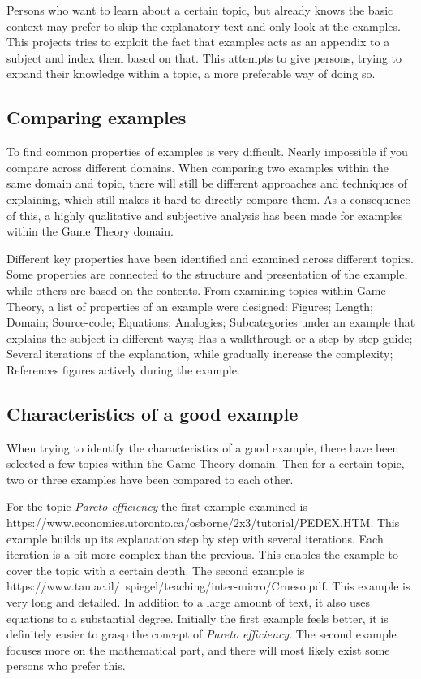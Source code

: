 Persons who want to learn about a certain topic, but already knows the basic context may prefer to skip the explanatory text and only look at the examples. This projects tries to exploit the fact that examples acts as an appendix to a subject and index them based on that. This attempts to give persons, trying to expand their knowledge within a topic, a more preferable way of doing so.

\subsection{Comparing examples} \label{comparing_examples}

To find common properties of examples is very difficult. Nearly impossible if you compare across different domains. When comparing two examples within the same domain and topic, there will still be different approaches and techniques of explaining, which still makes it hard to directly compare them. As a consequence of this, a highly qualitative and subjective analysis has been made for examples within the Game Theory domain. 

Different key properties have been identified and examined across different topics. Some properties are connected to the structure and presentation of the example, while others are based on the contents. From examining topics within Game Theory, a list of properties of an example were designed: Figures; Length; Domain; Source-code; Equations; Analogies; Subcategories under an example that explains the subject in different ways; Has a walkthrough or a step by step guide; Several iterations of the explanation, while gradually increase the complexity; References figures actively during the example.



\subsection{Characteristics of a good example} \label{good_example}

When trying to identify the characteristics of a good example, there have been selected a few topics within the Game Theory domain. Then for a certain topic, two or three examples have been compared to each other.  

For the topic \textit{Pareto efficiency} the first example examined is\\ https://www.economics.utoronto.ca/osborne/2x3/tutorial/PEDEX.HTM. This example builds up its explanation step by step with several iterations. Each iteration is a bit more complex than the previous. This enables the example to cover the topic with a certain depth. The second example is https://www.tau.ac.il/~spiegel/teaching/inter-micro/Crueso.pdf. This example is very long and detailed. In addition to a large amount of text, it also uses equations to a substantial degree. Initially the first example feels better, it is definitely easier to grasp the concept of \textit{Pareto efficiency}. The second example focuses more on the mathematical part, and there will most likely exist some persons who prefer this. 

